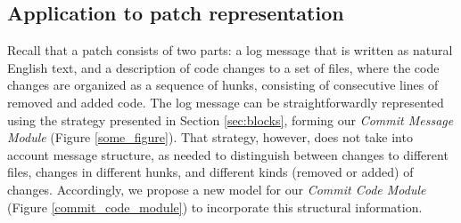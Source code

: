 \documentclass{article}
\begin{document}
\subsection{Application to patch representation}

Recall that a patch consists of two parts: a log message that is written as
natural English text, and a description of code changes to a set of files,
where the code changes are organized as a sequence of hunks, consisting of
consecutive lines of removed and added code.  The log message can be
straightforwardly represented using the strategy presented in Section
\ref{sec:blocks}, forming our {\em Commit Message Module} (Figure
\ref{some_figure}).  That strategy, however, does not take into account
message structure, as needed to distinguish between changes to different
files, changes in different hunks, and different kinds (removed or added)
of changes.  Accordingly, we propose a new model for our {\em Commit Code
  Module} (Figure \ref{commit_code_module}) to incorporate this structural
  information.
\end{document}
